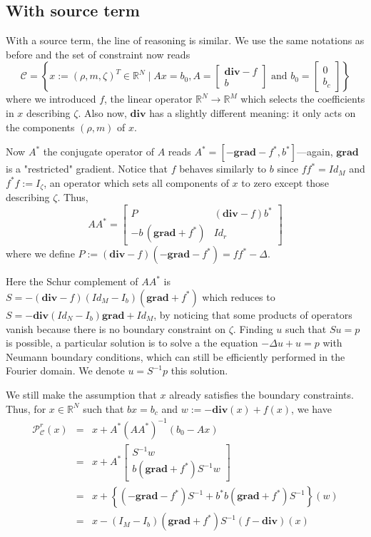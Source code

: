 \documentclass[13pt,aps,prb,preprint]{article}
\renewcommand{\div}{\mathbf{div}}
\newcommand{\grad}{\mathbf{grad}}
\newcommand{\R}{\mathbb{R}}
\begin{document}
\subsection{With source term}
With a source term, the line of reasoning is similar. We use the same notations as before and the set of constraint now reads
\begin{equation}
\mathcal{C} = \left\{   x := (\rho,m,\zeta)^T \in \R^N \mid  Ax = b_0 , A = \left[
\begin{array}{c}
\div - f \\ \hline
b
\end{array}
\right]  \text{  and } b_0 = \left[
\begin{array}{c}
0  \\ \hline
b_c
\end{array}
\right]  \right\}
\end{equation}
where we introduced $f$, the linear operator $\R^N \rightarrow \R^M$ which selects the coefficients in $x$ describing $\zeta$. Also now, $\div$ has a slightly different meaning: it only acts on the components $(\rho,m)$ of $x$.

Now $A^*$ the conjugate operator of $A$ reads $A^* = [-\grad - f^* , b^*] $---again, $\grad$ is a "restricted" gradient.  Notice that $f$ behaves similarly to $b$ since $ff^*=Id_M$ and $f^*f:=I_{\zeta}$, an operator which sets all components of $x$ to zero except those describing $\zeta$. Thus,
\begin{equation}
AA^*= \left[
\begin{array}{c|c}
P & (\div - f) b^*\\ \hline
- b\, (\grad + f^*)& Id_r
\end{array} \right]
\end{equation}
where we define $P:=(\div -f)(-\grad -f^*) = ff^* -\Delta$.

Here the Schur complement of $AA^*$ is $S= - (\div - f) (Id_M-I_b) (\grad + f^*)$ which reduces to $S = - \div (Id_N - I_b)  \grad + Id_M$, by noticing that some products of operators vanish because there is no boundary constraint on $\zeta$. Finding $u$ such that $Su=p$  is possible, a particular solution is to solve a the equation $-\Delta u + u = p$ with Neumann boundary conditions, which can still be efficiently performed in the Fourier domain. We denote $u=S^{-1} p$ this solution.

We still make the assumption that $x$ already satisfies the boundary constraints. Thus, for $x\in \R^N$ such that $bx=b_c$ and $w:= -\div (x)+ f(x) $, we have
\begin{eqnarray}
\mathcal{P}_\mathcal{C}^r (x) & = & x + A^* (A A^*)^{-1}(b_0 -Ax) \\
& = & x + A^* \left[
\begin{array}{c}
S^{-1} w \\ \hline
b ( \grad +f^*) S^{-1}w
\end{array} \right] \\
& = & x + \left\{ (- \grad -f^*) S^{-1} +b^*b(\grad +f^*)S^{-1} \right\} (w)  \\
& = & x - (I_M-I_b)(\grad +f^*) S^{-1} (f - \div ) (x)
\end{eqnarray}
\end{document}
